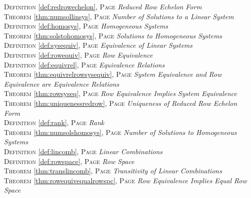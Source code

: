 \begin{multicols}{2}
{         \textsc{Definition} \ref{def:redrowechelon}, \textsc{Page} \pageref{def:redrowechelon} \textit{Reduced Row Echelon Form} \\
         \textsc{Theorem} \ref{thm:numsollinsys}, \textsc{Page} \pageref{thm:numsollinsys} \textit{Number of Solutions to a Linear System} \\
         \textsc{Definition} \ref{def:homosys}, \textsc{Page} \pageref{def:homosys} \textit{Homogeneous Systems} \\
         \textsc{Theorem} \ref{thm:solstohomosys}, \textsc{Page} \pageref{thm:solstohomosys} \textit{Solutions to Homogeneous Systems} \\
         \textsc{Definition} \ref{def:sysequiv}, \textsc{Page} \pageref{def:sysequiv} \textit{Equivalence of Linear Systems} \\
         \textsc{Definition} \ref{def:rowequiv}, \textsc{Page} \pageref{def:rowequiv} \textit{Row Equivalence} \\
         \textsc{Definition} \ref{def:equivrel}, \textsc{Page} \pageref{def:equivrel} \textit{Equivalence Relations} \\
         \textsc{Theorem} \ref{thm:equivrelrowsysequiv}, \textsc{Page} \pageref{thm:equivrelrowsysequiv} \textit{System Equivalence and Row Equivalence are Equivalence Relations} \\
         \textsc{Theorem} \ref{thm:rowsyseq}, \textsc{Page} \pageref{thm:rowsyseq} \textit{Row Equivalence Implies System Equivalence} \\
         \textsc{Theorem} \ref{thm:uniquenessredrow}, \textsc{Page} \pageref{thm:uniquenessredrow} \textit{Uniqueness of Reduced Row Echelon Form} \\
         \textsc{Definition} \ref{def:rank}, \textsc{Page} \pageref{def:rank} \textit{Rank} \\
         \textsc{Theorem} \ref{thm:numsolshomosys}, \textsc{Page} \pageref{thm:numsolshomosys} \textit{Number of Solutions to Homogeneous Systems} \\
         \textsc{Definition} \ref{def:lincomb}, \textsc{Page} \pageref{def:lincomb} \textit{Linear Combinations} \\
         \textsc{Definition} \ref{def:rowspace}, \textsc{Page} \pageref{def:rowspace} \textit{Row Space} \\
         \textsc{Theorem} \ref{thm:translincomb}, \textsc{Page} \pageref{thm:translincomb} \textit{Transitivity of Linear Combinations} \\
         \textsc{Theorem} \ref{thm:rowequivequalrowspc}, \textsc{Page} \pageref{thm:rowequivequalrowspc} \textit{Row Equivalence Implies Equal Row Space} \\
}
\end{multicols}
